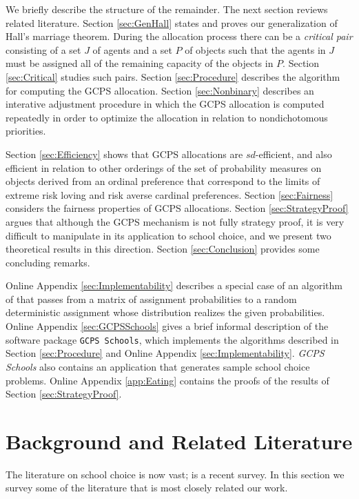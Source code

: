 \documentclass[12pt, A4paper]{article}
\theoremstyle{definition}
\begin{document}
We briefly describe the structure of the remainder.  The next section reviews related literature.  Section \ref{sec:GenHall} states and proves our generalization of Hall's marriage theorem.  During the allocation process there can be a \emph{critical pair} consisting of a set $J$ of agents and a set $P$ of objects such that the agents in $J$ must be assigned all of the remaining capacity of the objects in $P$.  Section \ref{sec:Critical} studies such pairs.  Section \ref{sec:Procedure} describes the algorithm for computing the GCPS allocation.  Section \ref{sec:Nonbinary} describes an interative adjustment procedure in which the GCPS allocation is computed repeatedly in order to optimize the allocation in relation to nondichotomous priorities.

Section \ref{sec:Efficiency} shows that GCPS allocations are $sd$-efficient, and also efficient in relation to other orderings of the set of probability measures on objects derived from an ordinal preference that correspond to the limits of extreme risk loving and risk averse cardinal preferences.
Section \ref{sec:Fairness} considers the fairness properties of GCPS allocations.  Section \ref{sec:StrategyProof} argues that although the GCPS mechanism is not fully strategy proof, it is very difficult to manipulate in its application to school choice, and we present two theoretical results in this direction.  Section \ref{sec:Conclusion} provides some concluding remarks.  

Online Appendix \ref{sec:Implementability} describes a special case of an algorithm of \cite{bckm13aer} that passes from a matrix of assignment probabilities to a random deterministic assignment whose distribution realizes the given probabilities.  Online Appendix \ref{sec:GCPSSchools} gives a brief informal description of the software package \texttt{GCPS Schools}, which implements the algorithms described in Section \ref{sec:Procedure} and Online Appendix \ref{sec:Implementability}. \emph{GCPS Schools} also contains an application that generates sample school choice problems.  Online Appendix \ref{app:Eating} contains the proofs of the results of Section \ref{sec:StrategyProof}.

\section{Background and Related Literature}

The literature on school choice is now vast; \citet{aa22nber} is a recent survey. In this section  we survey some of the literature that is most closely related our work. 
\end{document}
